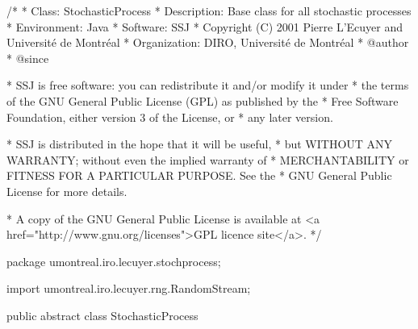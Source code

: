 \begin{code}
\begin{hide}
/*
 * Class:        StochasticProcess
 * Description:  Base class for all stochastic processes
 * Environment:  Java
 * Software:     SSJ 
 * Copyright (C) 2001  Pierre L'Ecuyer and Université de Montréal
 * Organization: DIRO, Université de Montréal
 * @author       
 * @since

 * SSJ is free software: you can redistribute it and/or modify it under
 * the terms of the GNU General Public License (GPL) as published by the
 * Free Software Foundation, either version 3 of the License, or
 * any later version.

 * SSJ is distributed in the hope that it will be useful,
 * but WITHOUT ANY WARRANTY; without even the implied warranty of
 * MERCHANTABILITY or FITNESS FOR A PARTICULAR PURPOSE.  See the
 * GNU General Public License for more details.

 * A copy of the GNU General Public License is available at
   <a href="http://www.gnu.org/licenses">GPL licence site</a>.
 */
\end{hide}
package umontreal.iro.lecuyer.stochprocess;\begin{hide}
import umontreal.iro.lecuyer.rng.RandomStream;
\end{hide}


public abstract class StochasticProcess \begin{hide} {
    // Used in some subclasses to make sure the 'setObservationTimes'
    // method has already been invoked before calling 'init'
    protected boolean observationTimesSet = false;

    protected double x0 = 0.0;       // Default Initial Value of the process
    protected int d = -1;             // Num. of observation times
    protected int observationIndex = 0; // Index of last generated obs time
    protected int observationCounter = 0; // Counts how many observations have
              // been generated so far. Useful when they are not generated in
              // chronological order.
    protected double[] t;            // Observation times
    protected double[] path;            // Observations of the process
    //protected RandomStream stream; // Random stream used to generate the process
    protected int[] observationIndexFromCounter; // Links counter# to index#
\end{hide}
\end{code}

